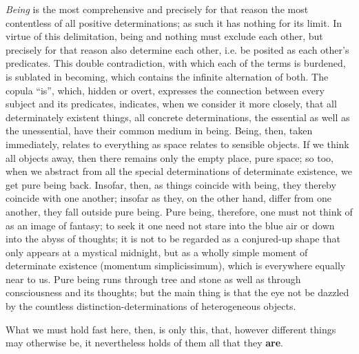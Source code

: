 \documentclass[12pt,a4paper,openany]{book}
\newcommand{\opage}[1]{\marginnote{\footnotesize\textit{[#1]}}}
\begin{document}
\emph{Being} is the most comprehensive and precisely for that reason the
most contentless of all positive determinations; as such it has
nothing for its limit. In virtue of this delimitation, being and nothing must exclude each other,
but precisely for that reason also determine each other,
i.e. be posited as each other's predicates. This double
contradiction, with which each of the terms is burdened,
is sublated in becoming, which contains the infinite
alternation of both.
The copula ``is'', which, hidden or overt, expresses the connection between every subject and its predicates, indicates, when we consider it more closely, that all determinately existent things, all concrete determinations, the essential as well as the unessential, have their common medium in being. Being, then, taken immediately, relates to everything as space relates to sensible objects. If we think all objects away, then there remains only
\setcounter{footnote}{0}%
\opage{2}the empty place, pure space; so too,
when we abstract from all the special determinations of determinate existence,
we get pure being back.
Insofar, then, as things coincide with
being, they thereby coincide with one another; insofar as they, on the other hand, differ from one another,
they fall outside pure being. Pure being,
therefore, one must not think of as an image of fantasy;
to seek it one need not stare into
the blue air or down into the abyss of thoughts; it is
not to be regarded as a conjured-up shape that only
appears at a mystical midnight, but as a wholly simple
moment of determinate existence (momentum simplicissimum),
which is everywhere equally near to us. Pure being runs
through tree and stone as well as through consciousness
and its thoughts; but the main thing is that the eye not be dazzled by the countless distinction-determinations of heterogeneous objects.

What we must hold fast here, then, is only this, that,
however different things may otherwise be, it nevertheless
holds of them all that they \textbf{are}.
\end{document}
